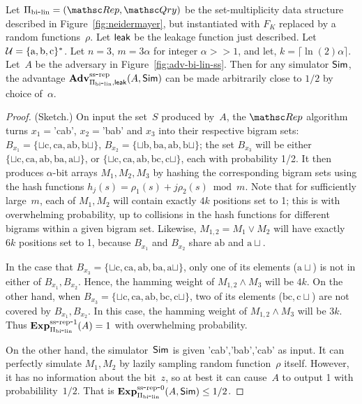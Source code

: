\begin{theorem}\label{thm:bi-lin-ss}
Let $\setprim_{\bilin}= (\Rep, \Qry)$ be the set-multiplicity data structure described in Figure~\ref{fig:neidermayer}, but instantiated with $F_{K}$ replaced by a random functions~$\rho$.  Let ${\sf leak}$ be the leakage function just described.   Let~${\cal U}=\{\mathrm{a,b,c}\}^*$. Let $n=3$,  $m=3\alpha $ for integer $\alpha >> 1$, and let, $k = \lceil \ln(2) \alpha \rceil$.  Let~$A$ be the adversary in Figure~\ref{fig:adv-bi-lin-ss}.  Then for any simulator ${\sf Sim}$, the advantage $\mathrm{\mathbf{Adv}}^{\mathrm{ss\mbox{-}rep}}_{\Pi_{\mathrm{bi}\mbox{-}\mathrm{lin}},{\sf leak}}(A,{\sf Sim})$ can be made arbitrarily close to $1/2$ by choice of~$\alpha$.

\end{theorem}
\begin{proof}(Sketch.)
On input the set~$S$ produced by~$A$, the $\Rep$ algorithm turns $x_1=$'cab', $x_2=$'bab' and $x_3$ into their respective bigram sets: $B_{x_1}=\{\sqcup\mathrm{c},\mathrm{ca},\mathrm{ab},\mathrm{b}\sqcup\}$, $B_{x_2}=\{\sqcup\mathrm{b},\mathrm{ba},\mathrm{ab}, \mathrm{b}\sqcup \}$; the set $B_{x_3}$ will be either $\{\sqcup\mathrm{c},\mathrm{ca},\mathrm{ab},\mathrm{ba}, \mathrm{a}\sqcup\}$, or $\{\sqcup\mathrm{c},\mathrm{ca},\mathrm{ab},\mathrm{bc}, \mathrm{c}\sqcup\}$, each with probability 1/2.  It then produces $\alpha$-bit arrays $M_1, M_2, M_3$ by hashing the corresponding bigram sets using the hash functions $h_j(s)=\rho_1(s)+ j\rho_2(s) \bmod m$.  Note that for sufficiently large~$m$, each of $M_1,M_2$ will contain exactly $4k$ positions set to 1; this is with overwhelming probability, up to collisions in the hash functions for different bigrams within a given bigram set.  Likewise, $M_{1,2}=M_1 \vee M_2$ will have exactly $6k$ positions set to 1, because $B_{x_1}$ and $B_{x_2}$ share $\mathrm{ab}$ and $\mathrm{a}\sqcup$.

In the case that $B_{x_3}=\{\sqcup\mathrm{c},\mathrm{ca},\mathrm{ab},\mathrm{ba}, \mathrm{a}\sqcup\}$, only one of its elements ($\mathrm{a}\sqcup$) is not in either of $B_{x_1},B_{x_2}$.  Hence, the hamming weight of $M_{1,2}\wedge M_3$ will be $4k$.  On the other hand, when $B_{x_3} = \{\sqcup\mathrm{c},\mathrm{ca},\mathrm{ab},\mathrm{bc}, \mathrm{c}\sqcup\}$, two of its elements ($\mathrm{bc}, \mathrm{c}\sqcup$) are not covered by $B_{x_1},B_{x_2}$.  In this case, the hamming weight of $M_{1,2} \wedge M_3$ will be $3k$.  Thus $\mathrm{\mathbf{Exp}}^{\mathrm{ss\mbox{-}rep\mbox{-}1}}_{\Pi_{\mathrm{bi}\mbox{-}\mathrm{lin}}}(A)=1$ with overwhelming probability.  

On the other hand, the simulator~${\sf Sim}$ is given 'cab','bab','cab' as
input.  It can perfectly simulate $M_1,M_2$ by lazily sampling random
function~$\rho$ itself.  However, it has no information about the
bit~$z$, so at best it can cause~$A$ to output 1 with
probabilility~$1/2$.  That is $\mathrm{\mathbf{Exp}}^{\mathrm{ss\mbox{-}rep\mbox{-}0}}_{\Pi_{\mathrm{bi}\mbox{-}\mathrm{lin}}}(A,{\sf Sim}) \leq 1/2$.
\end{proof}

